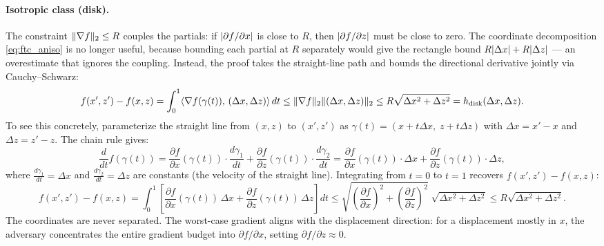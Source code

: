 \paragraph{Isotropic class (disk).}
The constraint $\lVert\nabla f\rVert_2 \leq R$ couples the partials: if $\lvert\partial f / \partial x\rvert$ is close to $R$, then $\lvert\partial f / \partial z\rvert$ must be close to zero.
The coordinate decomposition \eqref{eq:ftc_aniso} is no longer useful, because bounding each partial at $R$ separately would give the rectangle bound $R\lvert\Delta x\rvert + R\lvert\Delta z\rvert$ --- an overestimate that ignores the coupling.
Instead, the proof takes the straight-line path and bounds the directional derivative jointly via Cauchy--Schwarz:
\begin{equation*}
	f(x', z') - f(x, z) = \int_0^1 \langle \nabla f(\gamma(t)),\, (\Delta x, \Delta z) \rangle\, dt \leq \lVert\nabla f\rVert_2 \lVert(\Delta x, \Delta z)\rVert_2 \leq R\sqrt{\Delta x^2 + \Delta z^2} = h_{\mathrm{disk}}(\Delta x, \Delta z).
\end{equation*}
To see this concretely, parameterize the straight line from $(x, z)$ to $(x', z')$ as $\gamma(t) = (x + t\Delta x,\; z + t\Delta z)$ with $\Delta x = x' - x$ and $\Delta z = z' - z$.
The chain rule gives:
\begin{equation*}
	\frac{d}{dt}f(\gamma(t)) = \frac{\partial f}{\partial x}(\gamma(t))\cdot \frac{d\gamma_1}{dt} + \frac{\partial f}{\partial z}(\gamma(t))\cdot \frac{d\gamma_2}{dt} = \frac{\partial f}{\partial x}(\gamma(t))\cdot \Delta x + \frac{\partial f}{\partial z}(\gamma(t))\cdot \Delta z,
\end{equation*}
where $\frac{d\gamma_1}{dt} = \Delta x$ and $\frac{d\gamma_2}{dt} = \Delta z$ are constants (the velocity of the straight line).
Integrating from $t = 0$ to $t = 1$ recovers $f(x', z') - f(x, z)$:
\begin{equation*}
	f(x', z') - f(x, z) = \int_0^1 \left[ \frac{\partial f}{\partial x}(\gamma(t))\, \Delta x + \frac{\partial f}{\partial z}(\gamma(t))\, \Delta z \right] dt \leq \sqrt{\left(\frac{\partial f}{\partial x}\right)^2 + \left(\frac{\partial f}{\partial z}\right)^2}\; \sqrt{\Delta x^2 + \Delta z^2} \leq R\sqrt{\Delta x^2 + \Delta z^2}.
\end{equation*}
The coordinates are never separated.
The worst-case gradient aligns with the displacement direction: for a displacement mostly in $x$, the adversary concentrates the entire gradient budget into $\partial f / \partial x$, setting $\partial f / \partial z \approx 0$.

